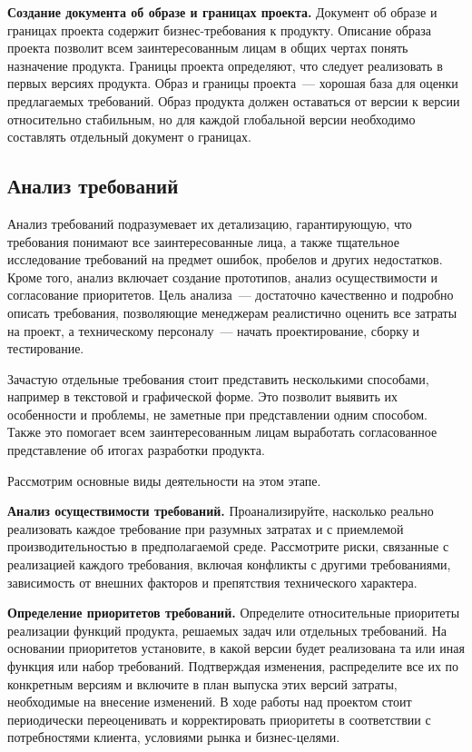 \documentclass{../../text-style}
\begin{document}
\textbf{Создание документа об образе и границах проекта.}
Документ об образе и границах проекта содержит бизнес-требования к продукту.
Описание образа проекта позволит всем заинтересованным лицам в общих чертах понять назначение продукта.
Границы проекта определяют, что следует реализовать в первых версиях продукта.
Образ и границы проекта~--- хорошая база для оценки предлагаемых требований.
Образ продукта должен оставаться от версии к версии относительно стабильным, но для каждой глобальной версии необходимо составлять отдельный документ о границах.

\subsection{Анализ требований}

Анализ требований подразумевает их детализацию, гарантирующую, что требования понимают все заинтересованные лица, а также тщательное исследование требований на предмет ошибок, пробелов и других недостатков.
Кроме того, анализ включает создание прототипов, анализ осуществимости и согласование приоритетов.
Цель анализа~--- достаточно качественно и подробно описать требования, позволяющие менеджерам реалистично оценить все затраты на проект, а техническому персоналу~--- начать проектирование, сборку и тестирование.

Зачастую отдельные требования стоит представить несколькими способами, например в текстовой и графической форме.
Это позволит выявить их особенности и проблемы, не заметные при представлении одним способом.
Также это помогает всем заинтересованным лицам выработать согласованное представление об итогах разработки продукта.

Рассмотрим основные виды деятельности на этом этапе.

\textbf{Анализ осуществимости требований.}
Проанализируйте, насколько реально реализовать каждое требование при разумных затратах и с приемлемой производительностью в предполагаемой среде.
Рассмотрите риски, связанные с реализацией каждого требования, включая конфликты с другими требованиями, зависимость от внешних факторов и препятствия технического характера.

\textbf{Определение приоритетов требований.}
Определите относительные приоритеты реализации функций продукта, решаемых задач или отдельных требований.
На основании приоритетов установите, в какой версии будет реализована та или иная функция или набор требований.
Подтверждая изменения, распределите все их по конкретным версиям и включите в план выпуска этих версий затраты, необходимые на внесение изменений.
В ходе работы над проектом стоит периодически переоценивать и корректировать приоритеты в соответствии с потребностями клиента, условиями рынка и бизнес-целями.
\end{document}
